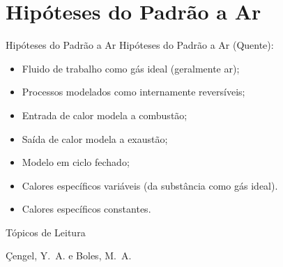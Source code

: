 \section{Hipóteses do Padrão a Ar}

    \begin{frame}{Hipóteses do Padrão a Ar}\vspace*{-1em}
        Hipóteses do Padrão a Ar (Quente):

        \begin{itemize}
            \item<1->  Fluido de trabalho como \alert{gás ideal} (geralmente ar);
            \item<2->  Processos modelados como \alert{internamente reversíveis};
            \item<3->  Entrada de \alert{calor} modela a combustão;
            \item<4->  Saída de \alert{calor} modela a exaustão;
            \item<5->  Modelo em \alert{ciclo fechado};
            \item<6->  Calores específicos \alert{variáveis} (da substância como gás ideal).
        \end{itemize}
        \vspace*\medskipamount

        
        \begin{itemize}
            \item<7->  Calores específicos \alert{constantes}.
        \end{itemize}
    \end{frame}

    \begin{frame}[allowframebreaks]{Tópicos de Leitura}
        \begin{thebibliography}{Çengel, Y.~A., 2013}
                Çengel, Y.~A. e Boles, M.~A.
        \end{thebibliography}
    \end{frame}





